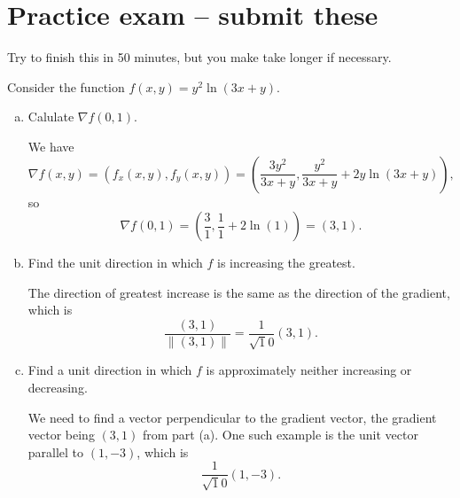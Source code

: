 \newpage

\section{Practice exam -- submit these}

Try to finish this in 50 minutes, but you make take longer if necessary.

\begin{problem}
  Consider the function $f(x,y)=y^2\ln(3x+y)$.
  \begin{enumerate}[(a)]
    \item Calulate $\nabla f(0,1)$.
    \begin{solution}
      We have
      \[\nabla f(x,y)=(f_x(x,y),f_y(x,y))=\left(\frac{3y^2}{3x+y},\frac{y^2}{3x+y}+2y\ln(3x+y)\right),\]
      so
      \[\nabla f(0,1)=\left(\frac{3}{1},\frac{1}{1}+2\ln(1)\right)=(3,1).\]
    \end{solution}
    \item Find the unit direction in which $f$ is increasing the greatest.
    \begin{solution}
      The direction of greatest increase is the same as the direction of the gradient, which is
      \[\frac{(3,1)}{\|(3,1)\|}=\frac1{\sqrt10}(3,1).\]
    \end{solution}
    \item Find a unit direction in which $f$ is approximately neither increasing or decreasing.
    \begin{solution}
      We need to find a vector perpendicular to the gradient vector, the gradient vector being $(3,1)$ from part (a). One such example is the unit vector parallel to $(1,-3)$, which is
      \[\frac1{\sqrt10}(1,-3).\]
    \end{solution}
  \end{enumerate}
\end{problem}


